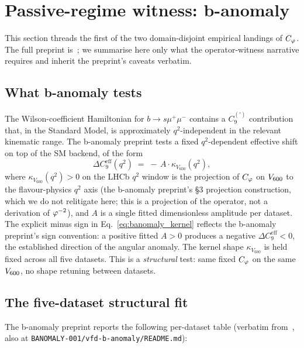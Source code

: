 \section{Passive-regime witness: b-anomaly}\label{sec:passive_witness}

This section threads the first of the two domain-disjoint empirical landings of
$C_{\varphi}$. The full preprint is~\citep{SmartBAnomaly2026}; we
summarise here only what the operator-witness narrative requires
and inherit the preprint's caveats verbatim.

\subsection{What b-anomaly tests}\label{ssec:banomaly_setup}

The Wilson-coefficient Hamiltonian for $b\to s\mu^{+}\mu^{-}$
contains a $C_{9}^{(\prime)}$ contribution that, in the Standard
Model, is approximately $q^{2}$-independent in the relevant
kinematic range. The b-anomaly preprint tests a fixed
$q^{2}$-dependent effective shift on top of the SM backend, of the
form
\begin{equation}\label{eq:banomaly_kernel}
\Delta C_{9}^{\mathrm{eff}}(q^{2})
\;=\;
-\,A \cdot \kappa_{V_{600}}(q^{2}),
\end{equation}
where $\kappa_{V_{600}}(q^{2}) > 0$ on the LHCb $q^{2}$ window is
the projection of $C_{\varphi}$ on $V_{600}$ to the flavour-physics
$q^{2}$ axis (the b-anomaly preprint's §3 projection construction,
which we do not relitigate here; this is a projection of the
operator, not a derivation of $\varphi^{-2}$), and $A$ is a single
fitted dimensionless amplitude per dataset. The explicit minus
sign in Eq.~\eqref{eq:banomaly_kernel} reflects the b-anomaly
preprint's sign convention: a positive fitted $A>0$ produces a
negative $\Delta C_{9}^{\mathrm{eff}}<0$, the established
direction of the angular anomaly. The kernel shape
$\kappa_{V_{600}}$ is held fixed across all five datasets.
This is a \emph{structural} test: same fixed $C_{\varphi}$ on the same
$V_{600}$, no shape retuning between datasets.

\subsection{The five-dataset structural fit}

The b-anomaly preprint reports the following per-dataset table
(verbatim from~\citep{SmartBAnomaly2026}, also at
\texttt{BANOMALY-001/vfd-b-anomaly/README.md}):

